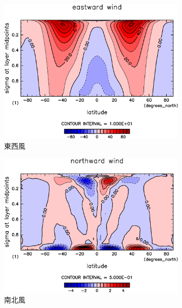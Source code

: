 \documentclass[body]{subfiles}
\begin{document}
\begin{figure}[t]
	\centering
	\begin{subfigure}{.4\textwidth}
		\centering
		\includegraphics[width=\textwidth]{S1366-nc/U,time=3650:4015-crop-rotate.pdf}
		\caption{東西風\hmu*{[m/s]}}\label{S1366nc東西風}
	\end{subfigure}
	\begin{subfigure}{.4\textwidth}
		\centering
		\includegraphics[width=\textwidth]{S1366-nc/V,time=3650:4015-crop-rotate.pdf}
		\caption{南北風\hmu*{[m/s]}}\label{S1366nc南北風}
	\end{subfigure}
	\begin{subfigure}{.4\textwidth}

\end{subfigure}
\end{figure}
\end{document}
